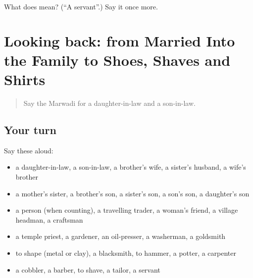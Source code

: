 \begin{tcolorbox}[breakable,colback=teal!4,colframe=teal!35!black,title={Before you move on}]
What does  mean? (\textquotedblleft{}A servant\textquotedblright{}.) Say it once more.
\end{tcolorbox}
\section[(dialogue)]{Looking back: from Married Into the Family to Shoes, Shaves and Shirts}

\label{lesson:MW-R265-review-260-265}



\begin{quote}
Say the Marwadi for a daughter-in-law and a son-in-law.
\end{quote}

\subsection*{Your turn}
Say these aloud:

\begin{itemize}
\raggedright
  \item a daughter-in-law, a son-in-law, a brother's wife, a sister's husband, a wife's brother
  \item a mother's sister, a brother's son, a sister's son, a son's son, a daughter's son
  \item a person (when counting), a travelling trader, a woman's friend, a village headman, a craftsman
  \item a temple priest, a gardener, an oil-presser, a washerman, a goldsmith
  \item to shape (metal or clay), a blacksmith, to hammer, a potter, a carpenter
  \item a cobbler, a barber, to shave, a tailor, a servant
\end{itemize}

